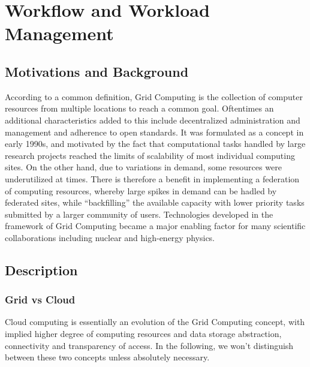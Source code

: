 \section{Workflow and Workload Management}

\subsection{Motivations and Background}
According to a common definition, Grid Computing is the collection of computer resources from multiple locations to reach a common goal. Oftentimes an additional characteristics added to this include decentralized
administration and management and adherence to open standards. It was formulated as a concept in early 1990s, and motivated by the fact that computational tasks handled by large research projects reached
the limits of scalability of most individual computing sites. On the other hand, due to variations in demand, some resources were underutilized at times. There is therefore a benefit in implementing a federation of
computing resources, whereby large spikes in demand can be hadled by federated sites, while ``backfilling'' the available capacity with lower priority tasks submitted by a larger community of users.
Technologies developed in the framework of Grid Computing became a major enabling factor for many scientific collaborations including nuclear and high-energy physics.

\subsection{Description}
\subsubsection{Grid vs Cloud}

Cloud computing is essentially an evolution of the Grid Computing concept, with implied higher degree of computing resources and data storage abstraction, connectivity and transparency of access.
In the following, we won't distinguish between these two concepts unless absolutely necessary.


%


